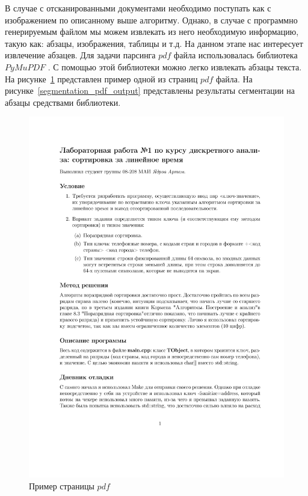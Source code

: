 В случае с отсканированными документами необходимо поступать как с изображением по описанному выше алгоритму. Однако, в случае с программно генерируемым файлом мы можем извлекать из него необходимую информацию, такую как: абзацы, изображения, таблицы и т.д.
На данном этапе нас интересует извлечение абзацев. Для задачи парсинга $pdf$ файла использовалась библиотека $PyMuPDF$ \cite{PyMuPDF}. С помощью этой библиотеки можно легко извлекать абзацы текста. На рисунке~\ref{segmentation_pdf_input} представлен пример одной из страниц $pdf$ файла. На рисунке~\ref{segmentation_pdf_output} представлены результаты сегментации на абзацы средствами библиотеки.
\begin{figure}
    \includegraphics[scale=0.65]{img/paragraph/pdf_input.jpg}
    \caption{Пример страницы $pdf$}
    \label{segmentation_pdf_input}
\end{figure}

